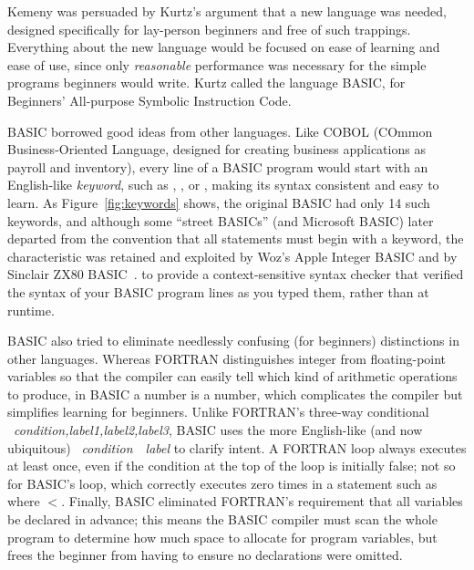 Kemeny was persuaded by Kurtz's argument that a new language was needed,
designed specifically for lay-person beginners and free of such
trappings.
Everything about the new language would be focused on ease of learning
and ease of use, since only \emph{reasonable} performance was necessary
for the simple programs beginners would write.
Kurtz called the language BASIC, for Beginners' All-purpose Symbolic
Instruction Code.

BASIC borrowed good ideas from other languages.
Like COBOL (COmmon Business-Oriented Language, designed for creating
business applications as payroll and inventory), every line of a BASIC
program would start with an English-like \emph{keyword}, such as
, , or , making its syntax consistent and easy
to learn.
As Figure~\ref{fig:keywords} shows,
the original BASIC had only 14 such keywords, 
and although some ``street BASICs'' (and Microsoft BASIC) later departed from the
convention that all statements must begin with a keyword, the characteristic
was retained and exploited by Woz's Apple Integer BASIC and by Sinclair
ZX80 BASIC~\cite{zx80_basic_techreport}.
to provide a context-sensitive syntax checker that verified the syntax
of your BASIC program lines as you typed them, rather than at
runtime.


BASIC  also tried to eliminate needlessly confusing (for beginners)
distinctions in 
other languages.
Whereas FORTRAN distinguishes integer from floating-point variables so
that the compiler can easily tell which kind of arithmetic operations to
produce, 
in BASIC a number is a number, which complicates the compiler but
simplifies learning for beginners.
Unlike FORTRAN's three-way conditional
~\emph{condition,label1,label2,label3}, 
BASIC uses the more English-like
(and now ubiquitous)
~\emph{condition}~~\emph{label} to clarify intent.
A FORTRAN  loop always executes at least once, even if the
condition at the top of the loop is initially false; not so for
BASIC's  loop, which correctly executes zero times
in a statement such as  where $<$.
Finally, BASIC eliminated FORTRAN's requirement that all variables be
declared in advance; this means the BASIC compiler
must scan the whole program to determine how much space to allocate for
program variables, but frees the beginner from having to ensure no
declarations were omitted.

